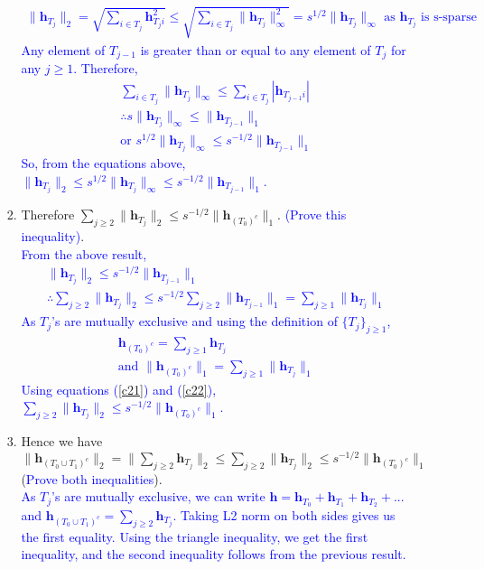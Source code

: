 \documentclass[11pt]{article}
\begin{document}
\begin{enumerate}
\begin{enumerate}
\begin{enumerate}
\textcolor{blue}{
\begin{gather*}
\|\mathbf{h}_{T_j}\|_2 = \sqrt{\sum_{i \in T_j} \mathbf{h}_{T_ji}^2} \leq \sqrt{\sum_{i \in T_j} \|\mathbf{h}_{T_j}\|_\infty^2} = s^{1/2}\|\mathbf{h}_{T_j}\|_\infty \text{ as } \mathbf{h}_{T_j} \text{ is s-sparse}
\end{gather*}
Any element of $T_{j-1}$ is greater than or equal to any element of $T_j$ for any $j \geq 1$. Therefore,
\begin{gather*}
\sum_{i \in T_j} \|\mathbf{h}_{T_j}\|_\infty \leq \sum_{i \in T_j} |\mathbf{h}_{T_{j-1}i}| \\
\therefore s\|\mathbf{h}_{T_j}\|_\infty \leq \|\mathbf{h}_{T_{j-1}}\|_1 \\
\text{or } s^{1/2} \|\mathbf{h}_{T_j}\|_\infty \leq s^{-1/2} \|\mathbf{h}_{T_{j-1}}\|_1
\end{gather*}
So, from the equations above, $\|\mathbf{h}_{T_j}\|_2 \leq s^{1/2} \|\mathbf{h}_{T_j}\|_\infty \leq s^{-1/2} \|\mathbf{h}_{T_{j-1}}\|_1$.
 } 
\item Therefore $\sum_{j \geq 2}\|\mathbf{h}_{T_j}\|_2 \leq s^{-1/2} \|\mathbf{h}_{(T_0)^c}\|_1$. \textcolor{blue}{(Prove this inequality)}. \\
\textcolor{blue}{
From the above result,
\begin{gather}
\|\mathbf{h}_{T_j}\|_2 \leq s^{-1/2} \|\mathbf{h}_{T_{j-1}}\|_1 \\
\therefore \sum_{j \geq 2}\|\mathbf{h}_{T_j}\|_2 \leq s^{-1/2} \sum_{j \geq 2}\|\mathbf{h}_{T_{j-1}}\|_1 = \sum_{j \geq 1}\|\mathbf{h}_{T_{j}}\|_1
\label{c21}
\end{gather}
As $T_j$'s are mutually exclusive and using the definition of $\{T_j\}_{j \geq 1}$,
\begin{gather}
\mathbf{h}_{(T_0)^c} = \sum_{j \geq 1}\mathbf{h}_{T_{j}} \\
\text{and }\|\mathbf{h}_{(T_0)^c}\|_1 =  \sum_{j \geq 1}\|\mathbf{h}_{T_{j}}\|_1
\label{c22}
\end{gather}
Using equations (\ref{c21}) and (\ref{c22}), $\sum_{j \geq 2}\|\mathbf{h}_{T_j}\|_2 \leq s^{-1/2} \|\mathbf{h}_{(T_0)^c}\|_1$.
}
\item Hence we have $\|\mathbf{h}_{(T_0 \cup T_1)^c}\|_2 = \|\sum_{j \geq 2} \mathbf{h}_{T_j}\|_2 \leq \sum_{j \geq 2} \|\mathbf{h}_{T_j}\|_2 \leq s^{-1/2} \|\mathbf{h}_{(T_0)^c}\|_1$ (\textcolor{blue}{Prove both inequalities}).\\
\textcolor{blue}{
As $T_j$'s are mutually exclusive, we can write $\mathbf{h} = \mathbf{h}_{T_0} + \mathbf{h}_{T_1} + \mathbf{h}_{T_2} + ...$ and $\mathbf{h}_{(T_0 \cup T_1)^c} = \sum_{j \geq 2} \mathbf{h}_{T_j}$. Taking L2 norm on both sides gives us the first equality. Using the triangle inequality, we get the first inequality, and the second inequality follows from the previous result.
}
\end{enumerate}
\end{enumerate}
\end{enumerate}
\end{document}
